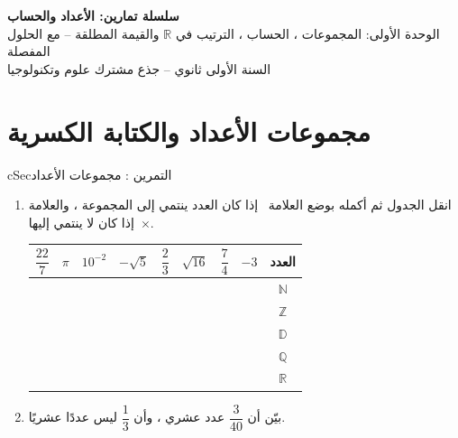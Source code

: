 \documentclass[12pt,a4paper]{article}
\newenvironment{BOX}[2]{\begin{otherlanguage}{english}\begin{arbox}{#1}{#2}}{\end{arbox}\end{otherlanguage}}
\newcounter{exo}
\newenvironment{tamrin}[1]{\stepcounter{exo}\begin{BOX}{cSec}{التمرين \theexo: #1}}{\end{BOX}}
\newenvironment{LTR}{\begin{otherlanguage}{english}}{\end{otherlanguage}}
\newcommand{\ar}[1]{\foreignlanguage{arabic}{#1}}
\newcommand{\N}{\mathbb{N}}
\newcommand{\Z}{\mathbb{Z}}
\newcommand{\D}{\mathbb{D}}
\newcommand{\Q}{\mathbb{Q}}
\newcommand{\R}{\mathbb{R}}
\newcommand{\yes}{{\color{cRem}\checkmark}}
\newcommand{\no}{{\color{cThm}$\times$}}
\begin{document}
\begin{LTR}
\begin{tcolorbox}[enhanced,colback=cSec!10,colframe=cSec!40,arc=3mm,halign=center,boxrule=0.6pt,top=12pt,bottom=12pt,before upper={\selectlanguage{arabic}}]
{\color{cSec}\fontsize{25}{31}\selectfont\bfseries سلسلة تمارين: الأعداد والحساب}\\[8pt]
{\color{cSec!80!black}\large الوحدة الأولى: المجموعات ، الحساب ، الترتيب في $\mathbb{R}$ والقيمة المطلقة -- مع الحلول المفصلة}\\[5pt]
{\color{cSec!80!black}\large السنة الأولى ثانوي -- جذع مشترك علوم وتكنولوجيا}
\end{tcolorbox}
\end{LTR}

\section{مجموعات الأعداد والكتابة الكسرية}
\begin{tamrin}{مجموعات الأعداد}
\begin{enumerate}
\item انقل الجدول ثم أكمله بوضع العلامة \yes\ إذا كان العدد ينتمي إلى المجموعة ، والعلامة \no\ إذا كان لا ينتمي إليها.
\begin{center}
\renewcommand{\arraystretch}{1.6}
\begin{tabular}{|c|c|c|c|c|c|c|c|c|}\hline
\rowcolor{cSec!12}$\dfrac{22}7$ & $\pi$ & $10^{-2}$ & $-\sqrt5$ & $\dfrac23$ & $\sqrt{16}$ & $\dfrac74$ & $-3$ & \ar{العدد}\\\hline
 & & & & & & & & $\N$\\\hline
 & & & & & & & & $\Z$\\\hline
 & & & & & & & & $\D$\\\hline
 & & & & & & & & $\Q$\\\hline
 & & & & & & & & $\R$\\\hline
\end{tabular}
\end{center}
\item بيّن أن $\dfrac3{40}$ عدد عشري ، وأن $\dfrac13$ ليس عددًا عشريًا.
\end{enumerate}
\end{tamrin}
\end{document}
